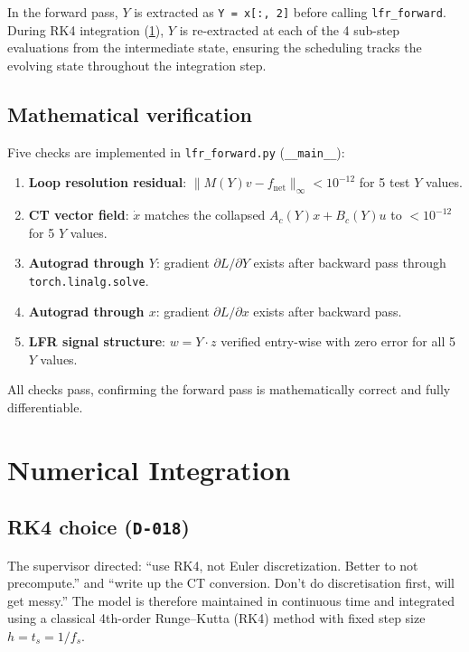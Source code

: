 \documentclass[11pt,a4paper]{article}
\newcommand{\ts}{t_s}
\newcommand{\fs}{f_s}
\newcommand{\xdot}{\dot{x}}
\newcommand{\decref}[1]{\texttt{D-#1}}
\newcommand{\pyfile}[1]{\texttt{#1}}
\begin{document}
In the forward pass, $Y$ is extracted as \texttt{Y = x[:, 2]} before calling
\texttt{lfr\_forward}. During RK4 integration (\cref{sec:integration}), $Y$ is re-extracted
at each of the 4 sub-step evaluations from the intermediate state, ensuring the scheduling
tracks the evolving state throughout the integration step.

\subsection{Mathematical verification}
\label{sec:lfr_verification}

Five checks are implemented in \pyfile{lfr\_forward.py} (\texttt{\_\_main\_\_}):
\begin{enumerate}[nosep]
\item \textbf{Loop resolution residual}: $\|M(Y) v - f_{\text{net}}\|_\infty < 10^{-12}$
  for 5 test $Y$ values.
\item \textbf{CT vector field}: $\xdot$ matches the collapsed $A_c(Y) x + B_c(Y) u$ to
  $< 10^{-12}$ for 5 $Y$ values.
\item \textbf{Autograd through $Y$}: gradient $\partial L / \partial Y$ exists after backward
  pass through \texttt{torch.linalg.solve}.
\item \textbf{Autograd through $x$}: gradient $\partial L / \partial x$ exists after backward
  pass.
\item \textbf{LFR signal structure}: $w = Y \cdot z$ verified entry-wise with zero error for
  all 5 $Y$ values.
\end{enumerate}
All checks pass, confirming the forward pass is mathematically correct and fully
differentiable.


\section{Numerical Integration}
\label{sec:integration}

\subsection{RK4 choice (\decref{018})}

The supervisor directed: ``use RK4, not Euler discretization. Better to not precompute.''
and ``write up the CT conversion. Don't do discretisation first, will get messy.'' The model
is therefore maintained in continuous time and integrated using a classical 4th-order
Runge--Kutta (RK4) method with fixed step size $h = \ts = 1/\fs$.
\end{document}
